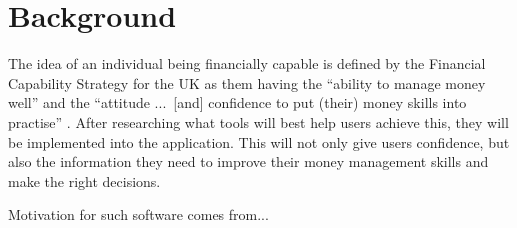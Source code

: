\section{Background}
\label{sec:background}

The idea of an individual being financially capable is defined by the Financial Capability Strategy for the UK as them having the ``ability to manage money well'' and the ``attitude ...\ [and] confidence to put (their) money skills into practise'' \cite{FinancialCapabilityUK}. After researching what tools will best help users achieve this, they will be implemented into the application. This will not only give users confidence, but also the information they need to improve their money management skills and make the right decisions.

Motivation for such software comes from...